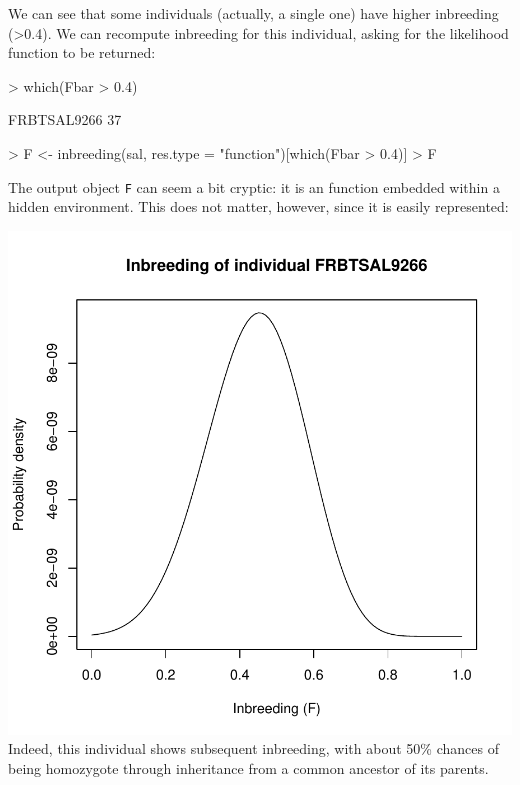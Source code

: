 \documentclass{article}
\begin{document}
\noindent We can see that some individuals (actually, a single one) have higher inbreeding (>0.4). We can recompute
inbreeding for this individual, asking for the likelihood function to be returned:
\begin{Schunk}
\begin{Sinput}
> which(Fbar > 0.4)
\end{Sinput}
\begin{Soutput}
FRBTSAL9266 
         37 
\end{Soutput}
\begin{Sinput}
> F <- inbreeding(sal, res.type = "function")[which(Fbar > 0.4)]
> F
\end{Sinput}
\end{Schunk}
The output object \texttt{F} can seem a bit cryptic: it is an function embedded within a hidden environment.
This does not matter, however, since it is easily represented:
\begin{Schunk}
\end{Schunk}
\includegraphics{figs/base-065}
\noindent Indeed, this individual shows subsequent inbreeding, with about 50\% chances of being
homozygote through inheritance from a common ancestor of its parents.
\end{document}
